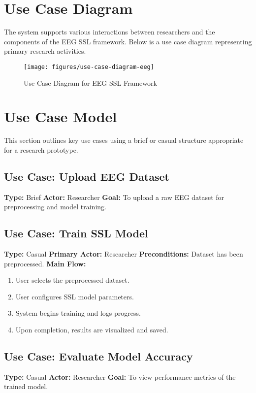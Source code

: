 \section{Use Case Diagram}
\label{sec:use-case-diagram}
The system supports various interactions between researchers and the components of the EEG SSL framework. Below is a use case diagram representing primary research activities.


\begin{figure}[H]
    \centering
    \texttt{[image: figures/use-case-diagram-eeg]}
    \caption{Use Case Diagram for EEG SSL Framework}\label{fig:figure}
\end{figure}
\newpage

\section{Use Case Model}
\label{sec:use-case-model}

This section outlines key use cases using a brief or casual structure appropriate for a research prototype.

\subsection*{Use Case: Upload EEG Dataset}
\textbf{Type:} Brief
\textbf{Actor:} Researcher
\textbf{Goal:} To upload a raw EEG dataset for preprocessing and model training.

\subsection*{Use Case: Train SSL Model}
\textbf{Type:} Casual
\textbf{Primary Actor:} Researcher
\textbf{Preconditions:} Dataset has been preprocessed.
\textbf{Main Flow:}
\begin{enumerate}
    \item User selects the preprocessed dataset.
    \item User configures SSL model parameters.
    \item System begins training and logs progress.
    \item Upon completion, results are visualized and saved.
\end{enumerate}

\subsection*{Use Case: Evaluate Model Accuracy}
\textbf{Type:} Casual
\textbf{Actor:} Researcher
\textbf{Goal:} To view performance metrics of the trained model.

